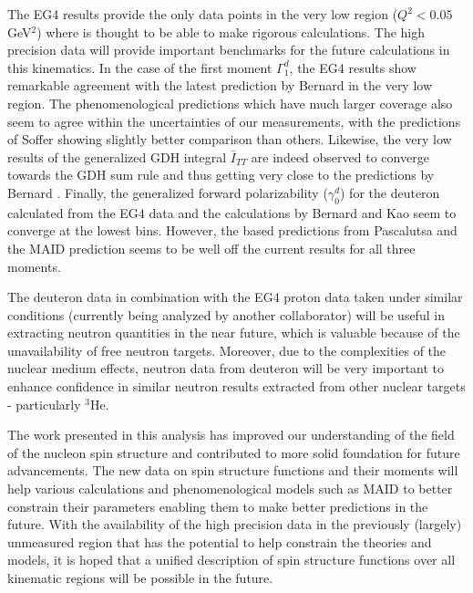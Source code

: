 The EG4 results provide the only data points in the very low \qsqs region ($Q^2<0.05$ GeV$^2$) where \chipts is thought to be able to make rigorous calculations. The high precision data will provide important benchmarks for the future calculations in this kinematics. In the case of the first moment $\Gamma^d_1$, the EG4 results show remarkable agreement with the latest \chipts prediction by Bernard \etal \cite{BEKM13} in the very low \qsqs region. The phenomenological predictions which have much larger \qsqs coverage also seem to agree within the uncertainties of our measurements, with the predictions of Soffer \etal showing slightly better comparison than others. 
Likewise, the very low \qsqs results of the generalized GDH integral $\bar{I}_{TT}$ are indeed observed to converge towards the GDH sum rule and thus getting very close to the \chipts predictions by Bernard \etal \cite{BEKM13}. 
Finally, the generalized forward polarizability ($\gamma^d_0$) for the deuteron calculated from the EG4 data and the \chipts calculations by Bernard \etal and Kao \etal seem to converge at the lowest \qsqs bins.  However, the \chipts based predictions from Pascalutsa \etal and the MAID prediction seems to be well off the current results for all three moments.


The deuteron data in combination with the EG4 proton data taken under similar conditions %
(currently being analyzed by another collaborator) %
will be useful in extracting neutron quantities in the near future, which is valuable because of the unavailability of free neutron targets. Moreover, due to the complexities of the nuclear medium effects, neutron data from deuteron will be very important to enhance confidence in similar neutron results extracted from other nuclear targets - particularly $^3$He. 

The work presented in this analysis has improved our understanding of the field of the nucleon spin structure and contributed to more solid foundation for future advancements. 
The new data on spin structure functions and their moments will help various \chipts calculations and phenomenological models such as MAID to better constrain their parameters enabling them to make better predictions in the future.  %
With the availability of the high precision data in the previously (largely) unmeasured region that has the potential to help constrain the theories and models, it is hoped that a unified description of spin structure functions over all kinematic regions will be possible in the future.

